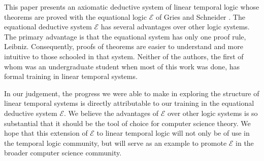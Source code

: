 \documentclass[12pt, fleqn, leqno]{article}
\begin{document}
This paper presents an axiomatic deductive system of linear temporal logic whose theorems are proved with the equational
logic $\mathcal{E}$ of Gries and Schneider \cite{LADM}.
The equational deductive system $\mathcal{E}$ has several advantages over other logic systems.
The primary advantage is that the equational system has only one proof rule, Leibniz.
Consequently, proofs of theorems are easier to understand and more intuitive to those schooled in that system.
Neither of the authors, the first of whom was an undergraduate student when most of this work was done,
has formal training in linear temporal systems.

In our judgement, the progress we were able to make in exploring the structure of linear temporal systems
is directly attributable to our training in the equational deductive system $\mathcal{E}$.
We believe the advantages of $\mathcal{E}$ over other logic systems is so substantial that it should be the
tool of choice for computer science theory.
We hope that this extension of $\mathcal{E}$ to linear temporal logic will not only be of use in the
temporal logic community, but will serve as an example to promote $\mathcal{E}$ in the broader computer science community.



\end{document}
